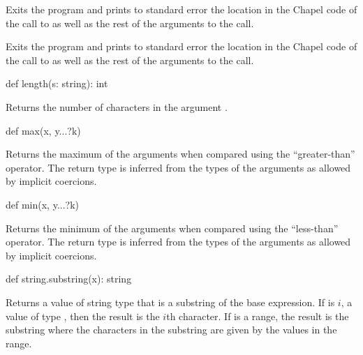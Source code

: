 \begin{protohead}
def halt() {
\end{protohead}
\begin{protobody}
Exits the program and prints to standard error the location in the
Chapel code of the call to  as well as the rest of the
arguments to the call.
\end{protobody}

\begin{protohead}
def halt(args ...?numArgs) {
\end{protohead}
\begin{protobody}
Exits the program and prints to standard error the location in the
Chapel code of the call to  as well as the rest of the
arguments to the call.
\end{protobody}

\begin{protohead}
def length(s: string): int
\end{protohead}
\begin{protobody}
Returns the number of characters in the argument .
\end{protobody}

\begin{protohead}
def max(x, y...?k)
\end{protohead}
\begin{protobody}
Returns the maximum of the arguments when compared using the
``greater-than'' operator.  The return type is inferred from the types
of the arguments as allowed by implicit coercions.
\end{protobody}

\begin{protohead}
def min(x, y...?k)
\end{protohead}
\begin{protobody}
Returns the minimum of the arguments when compared using the
``less-than'' operator.  The return type is inferred from the types of
the arguments as allowed by implicit coercions.
\end{protobody}

\begin{protohead}
def string.substring(x): string
\end{protohead}
\begin{protobody}
Returns a value of string type that is a substring of the base
expression.  If  is $i$, a value of type , then the
result is the $i$th character.  If  is a range, the result is
the substring where the characters in the substring are given by the
values in the range.
\end{protobody}

